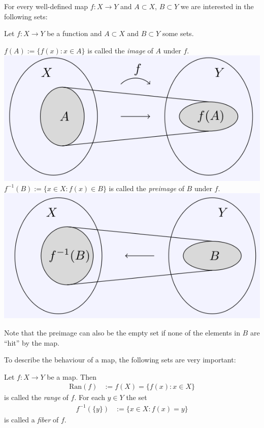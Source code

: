 


For every well-defined map $f: X\to Y$ and $A\subset X$, $B \subset Y$ we are interested in the following sets:
\begin{Definition}{} 
Let $f: X\rightarrow Y$ be a function and $A\subset X$ and $B\subset Y$ some sets.

$f(A):= \lbrace f(x): x\in A\rbrace$ is called the \emph{image} of $A$ under $f$.
\includegraphics{./image.png}
%
$f^{-1}(B):= \lbrace x\in X: f(x) \in B \rbrace$ is called the \emph{preimage} of $B$ under $f$.
\includegraphics{./preimage.png}
\end{Definition}
%
Note that the preimage can also be the empty set if none of the
elements in $B$ are ``hit'' by the map.

To describe the behaviour of a map,
the following sets are very important:

\begin{Definition}
Let $f: X\rightarrow Y$ be a map. Then
\begin{align*}
 \mathrm{Ran}(f) &:= f(X) = \{ f(x) : x \in X \} 
\end{align*}
is called the \emph{range} of $f$.
For each $y\in Y$ the set
\begin{align*}
 f^{-1}(\{y \}) &:= \{ x \in X : f(x) = y \} 
\end{align*}
is called a \emph{fiber} of $f$.
\end{Definition}
